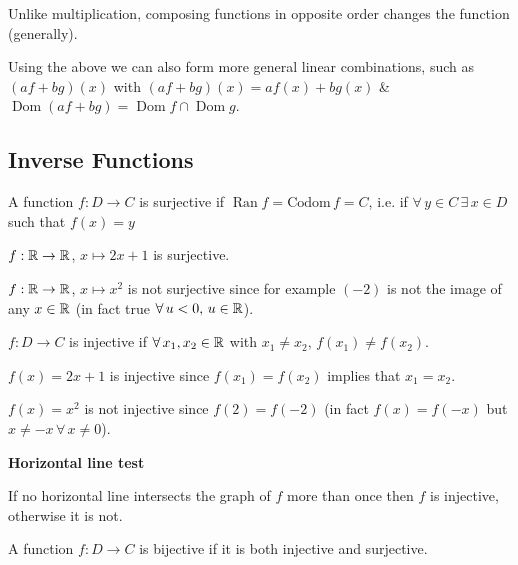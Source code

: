 \documentclass[10pt, a4paper]{article}
\DeclareMathOperator{\Dom}{Dom}
\DeclareMathOperator{\Ran}{Ran}
\begin{document}
Unlike multiplication, composing functions in opposite order changes the function (generally).

Using the above we can also form more general linear combinations, such as $(af + bg)(x)$ with $(af + bg)(x) = af(x) + bg(x)$ \& $\Dom (af + bg) = \Dom f \cap \Dom g$.

\subsection{Inverse Functions}
\begin{definition}
    A function $f : D \rightarrow C$ is surjective if $\Ran f = \mathrm{Codom}\, f = C$, i.e. if $\forall\, y \in C\, \exists\, x \in D$ such that $f(x) = y$
\end{definition}
\begin{example}
    $f : \mathbb{R} \rightarrow \mathbb{R}$, $x \mapsto 2x + 1$ is surjective.

    $f : \mathbb{R} \rightarrow \mathbb{R}$, $x \mapsto x ^ 2$ is not surjective since for example $(-2)$ is not the image of any $x \in \mathbb{R}$ (in fact true $\forall\,u < 0,\, u \in \mathbb{R}$).
\end{example}

\begin{definition}
    $f : D \rightarrow C$ is injective if $\forall\, x_1, x_2 \in \mathbb{R}$ with $x_1 \neq x_2,\, f(x_1) \neq f(x_2)$.
\end{definition}

\begin{example}
    $f(x) = 2x + 1$ is injective since $f(x_1) = f(x_2)$ implies that $x_1 = x_2$.

    $f(x) = x ^ 2$ is not injective since $f(2) = f(-2)$ (in fact $f(x) = f(-x)$ but $x \neq -x\, \forall\, x\neq 0$).
\end{example}

\textbf{Horizontal line test}

If no horizontal line intersects the graph of $f$ more than once then $f$ is injective, otherwise it is not.

\begin{definition}
    A function $f : D \rightarrow C$ is bijective if it is both injective and surjective.
\end{definition}
\end{document}
